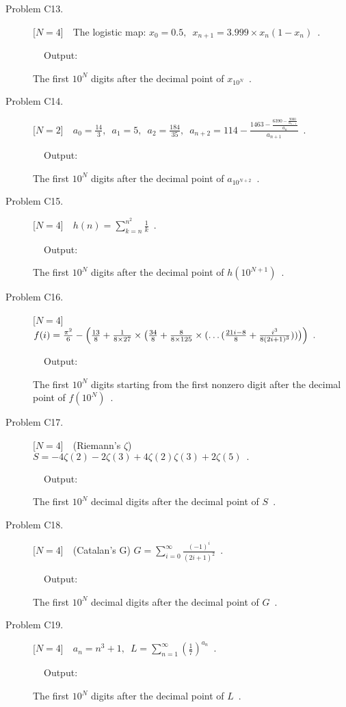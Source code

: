 \documentclass{article}
\begin{document}
\begin{description}
\item[Problem C13.] [$N=4$]~~The logistic map: $x_0=0.5,\enspace x_{n+1}=3.999\times x_{n} (1-x_{n})\enspace.$
\item[~~~~~~~~Output:]The first \ensuremath{10^N} digits after the decimal point of  $x_{\ensuremath{10^N}}\enspace$.

\item[Problem C14.] [$N=2$]~~$a_{0}=\frac{14}{3},\enspace a_{1}=5,\enspace a_{2}=\frac{184}{35},\enspace
            a_{n+2}=114-\frac{1463-\frac{6390-\frac{9000}{a_{n-1}}}{a_n}}{a_{n+1}}\enspace.$
\item[~~~~~~~~Output:]The first \ensuremath{10^N} digits after the decimal point of  $a_{10^{N+2}}\enspace$.

\item[Problem C15.] [$N=4$]~~$h(n)=\sum\limits_{k=n}^{n^2}\frac{1}{k}\enspace.$
\item[~~~~~~~~Output:]The first \ensuremath{10^N} digits after the decimal point of  $h(10^{N+1})\enspace$.

\item[Problem C16.] [$N=4$]~~$f(i)=\frac{\pi^2}{6}-\Big{(}\frac{13}{8}+\frac{1}{8{\times}27}\times\big{(}\frac{34}{8}
                +\frac{8}{8{\times}125}
              \times(\dots(\frac{21i-8}{8}+\frac{i^3}{8(2i+1)^3}))\big{)}\Big{)}\enspace.$
\item[~~~~~~~~Output:]The first \ensuremath{10^N} digits starting from the first nonzero digit after the decimal point of  $f(\ensuremath{10^N})\enspace$.

\item[Problem C17.] [$N=4$]~~(Riemann's $\zeta$) $S= -4\zeta(2) - 2\zeta(3) + 4\zeta(2)\zeta(3) + 2\zeta(5)\enspace.$
\item[~~~~~~~~Output:]The first \ensuremath{10^N} decimal digits after the decimal point of $S\enspace$.

\item[Problem C18.] [$N=4$]~~(Catalan's G) $G = \sum\limits_{i=0}^{\infty}\frac{(-1)^i}{(2i+1)^2}\enspace.$
\item[~~~~~~~~Output:]The first \ensuremath{10^N} decimal digits after the decimal point of $G\enspace$.

\item[Problem C19.] [$N=4$]~~$a_{n}=n^3+1,\enspace L= \sum\limits_{n=1}^{\infty} (\frac{1}{7})^{a_{n}}\enspace.$
\item[~~~~~~~~Output:]The first \ensuremath{10^N} digits after the decimal point of $L\enspace$.


\end{description}
\end{document}
